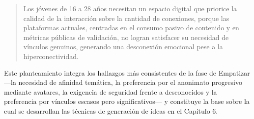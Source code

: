\begin{quote}
Los jóvenes de 16 a 28 años necesitan un espacio digital que priorice la calidad de la interacción sobre la cantidad de conexiones, porque las plataformas actuales, centradas en el consumo pasivo de contenido y en métricas públicas de validación, no logran satisfacer su necesidad de vínculos genuinos, generando una desconexión emocional pese a la hiperconectividad.
\end{quote}

Este planteamiento integra los hallazgos más consistentes de la fase de Empatizar —la necesidad de afinidad temática, la preferencia por el anonimato progresivo mediante avatares, la exigencia de seguridad frente a desconocidos y la preferencia por vínculos escasos pero significativos— y constituye la base sobre la cual se desarrollan las técnicas de generación de ideas en el Capítulo 6.